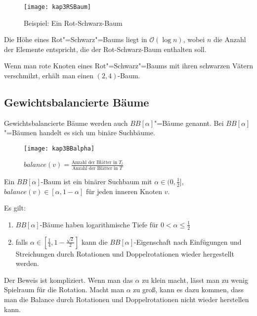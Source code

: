 \begin{figure}[htb]
  \centering
  \texttt{[image: kap3RSBaum]}
  \caption{Beispiel: Ein Rot-Schwarz-Baum}
  \label{RSBaum}
\end{figure}

Die Höhe eines Rot"=Schwarz"=Baums liegt in $\mathcal{O}(\log n)$, wobei $n$ die Anzahl der Elemente entspricht, die der Rot-Schwarz-Baum enthalten soll. %

Wenn man rote Knoten eines Rot"=Schwarz"=Baums mit ihren schwarzen Vätern verschmilzt, erhält man einen $(2,4)$-Baum.

\subsection{Gewichtsbalancierte Bäume}
Gewichtsbalancierte Bäume werden auch $BB[\alpha]$"=Bäume genannt. Bei $BB[\alpha]$"=Bäumen handelt es sich um binäre Suchbäume.

\begin{figure}[htb]
  \centering
  \texttt{[image: kap3BBalpha]}
  \caption{$balance(v) = \frac{\text{Anzahl der Blätter in } T_l}{\text{Anzahl der Blätter in } T}$}
\end{figure}

\begin{Def}[{$BB[\alpha]$-Baum}]
\hspace{\parindent}Ein $BB[\alpha]$-Baum ist ein binärer Suchbaum mit $\alpha \in (0, \frac{1}{2}]$, $balance(v) \in [\alpha, 1-\alpha]$ für jeden inneren Knoten $v$.
\end{Def}

Es gilt:
\begin{enumerate}
  \item $BB[\alpha]$-Bäume haben logarithmische Tiefe für $0 < \alpha \le \frac{1}{2}$
  \item falls $\alpha \in \left[ \frac{1}{4}, 1-\frac{\sqrt{2}}{2} \right]$ kann die $BB[\alpha]$-Eigenschaft nach Einfügungen und Streichungen durch Rotationen und Doppelrotationen wieder hergestellt werden.
\end{enumerate}

Der Beweis ist kompliziert. Wenn man das $\alpha$ zu klein macht, lässt man zu wenig Spielraum für die Rotation. Macht man $\alpha$ zu groß, kann es dazu kommen, dass man die Balance durch Rotationen und Doppelrotationen nicht wieder herstellen kann.

